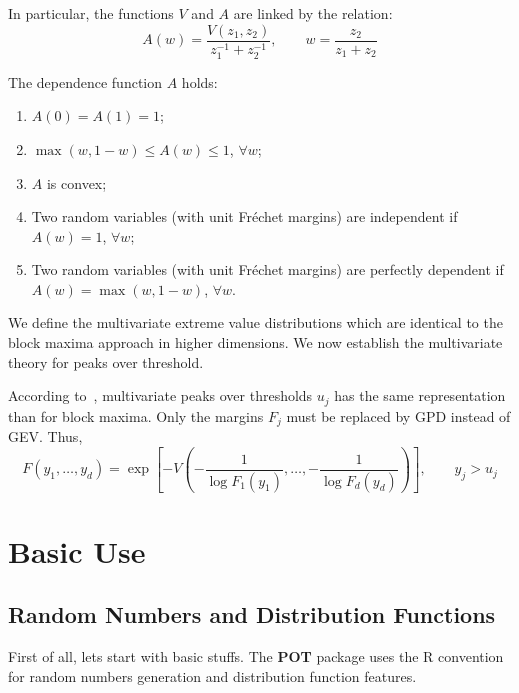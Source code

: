 \documentclass[a4paper]{article}
\numberwithin{equation}{section}
\theoremstyle{definition}
\begin{document}
In particular, the functions $V$ and $A$ are linked by the relation:
\begin{displaymath}
  A(w) = \frac{V\left(z_1,z_2\right)}{z_1^{-1} + z_2^{-1}},
  \qquad w = \frac{z_2}{z_1 + z_2}
\end{displaymath}

The dependence function $A$ holds:
\begin{enumerate}
\item $A(0) = A(1) = 1$;
\item $\max(w, 1 -w) \leq A(w) \leq 1$, $\forall w$;
\item $A$ is convex;
\item Two random variables (with unit Fr\'echet margins) are
  independent if $A(w)=1$, $\forall w$; 
\item Two random variables (with unit Fr\'echet margins) are
  perfectly dependent if $A(w)=\max(w,1-w)$, $\forall w$. 
\end{enumerate}

We define the multivariate extreme value distributions which are
identical to the block maxima approach in higher dimensions. We now
establish the multivariate theory for peaks over threshold.

According to~\citet[Prop. 5.15]{Resnick1987}, multivariate peaks over
thresholds $u_j$ has the same representation than for block
maxima. Only the margins $F_j$ must be replaced by GPD instead of
GEV\@. Thus,
\begin{equation}
  \label{eq:multExcess}
  F\left(y_1, \ldots, y_d \right) = \exp\left[-V\left( - \frac{1}{\log
      F_1\left(y_1 \right)}, \ldots, - \frac{1}{\log F_d\left(y_d
      \right)} \right) \right], \qquad y_j > u_j
\end{equation}

 
\section{Basic Use}
\label{sec:BasicUse}

\subsection{Random Numbers and Distribution Functions}
\label{subsec:randDist}

First of all, lets start with basic stuffs. The \textbf{POT} package
uses the R convention for random numbers generation and distribution
function features. 
\end{document}

